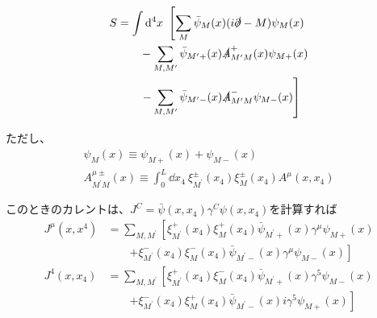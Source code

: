 \documentclass[
  unicode,a4paper,9pt,
  xcolor = {dvipsnames,svgnames},
  hyperref ={colorlinks=true,citecolor=Navy,linkcolor=NavyBlue,urlcolor=purple},
  ja=standard,lualatex
]{beamer}
\begin{document}
\begin{frame}

  \begin{align}
    S
    &=
    \int\dd^4 x\ 
    \left[  
      \sum_{M}\bar{\psi}_{M}(x)(i\slashed{\partial}-M)\psi_{M}(x)
    \right.
    \nonumber
    \\
    &\qquad
    -
    \sum_{M,M^{\prime}}\bar{\psi}_{M^{\prime}+}(x)\slashed{A}^{+}_{M^{\prime}M}(x)\psi_{M+}(x)
    \nonumber
    \\
    &\qquad
    \left.
    -\sum_{M,M^{\prime}}\bar{\psi}_{M^{\prime}-}(x)\slashed{A}^{-}_{M^{\prime}M}\psi_{M-}(x)
    \right]
    \nonumber
  \end{align}

  ただし、
  \begin{gather}
    \psi_{M}(x)
    \equiv
    \psi_{M+}(x)
    +
    \psi_{M-}(x)
    \nonumber
    \\
    A_{M^{\prime}M}^{\mu\pm}(x)
    \equiv
    \int_{0}^{L}
    \dd x_{4}\ 
    \xi_{M^{\prime}}^{\pm}(x_{4})\xi_{M}^{\pm}(x_{4})A^{\mu}(x,x_{4})
    \nonumber
  \end{gather}
  
\end{frame}


\begin{frame}

  このときのカレントは、$J^{C}=\bar{\psi}(x,x_{4})\gamma^{C}\psi(x,x_{4})$を計算すれば
  \begin{align*}
    J^{\mu}(x,x^{4})
    &=
    \sum_{M,M^{\prime}}
    \left[  
      \xi_{M^{\prime}}^{+}(x_{4})\xi_{M}^{+}(x_{4})\bar{\psi}_{M^{\prime}+}(x)\gamma^{\mu}\psi_{M+}(x)
    \right.
    \\
    &\qquad
    \left.
      +\xi_{M^{\prime}}^{-}(x_{4})\xi_{M}^{-}(x_{4})\bar{\psi}_{M^{\prime}-}(x)\gamma^{\mu}\psi_{M-}(x)
    \right]
    \\
    J^{4}(x,x_{4})
    &=
    \sum_{M,M^{\prime}}
    \left[  
      \xi_{M^{\prime}}^{+}(x_{4})\xi_{M}^{-}(x_{4})\bar{\psi}_{M^{\prime}+}(x)\gamma^{5}\psi_{M-}(x)
    \right.
    \\
    &\qquad
    \left.
      +\xi_{M^{\prime}}^{-}(x_{4})\xi_{M}^{+}(x_{4})\bar{\psi}_{M^{\prime}-}(x)i\gamma^{5}\psi_{M+}(x)
    \right]
  \end{align*}
  
\end{frame}
\end{document}
